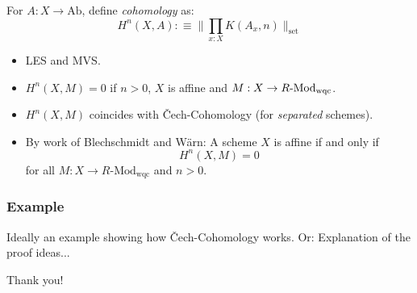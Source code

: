 \documentclass{beamer}
\begin{document}
\begin{frame}
  \vspace{0.25cm}
  For $A : X \to \mathrm{Ab}$, define \emph{cohomology} as:
  \[ H^n(X, A) :\equiv \Big\| \prod_{x:X}K(A_x,n) \Big\|_{\mathrm{set}} \]
  \begin{itemize}
  \item LES and MVS.
  \item $H^n(X,M)=0$ if $n>0$, $X$ is affine and $M:X\to R\text{-}\mathrm{Mod}_{\mathrm{wqc}}$.
  \item $H^n(X,M)$ coincides with \v{C}ech-Cohomology (for \emph{separated} schemes).
  \item By work of Blechschmidt and Wärn: A scheme $X$ is affine if and only if
      \[ H^n(X, M) = 0 \]
      for all $M : X \to R\text{-}\mathrm{Mod}_{\mathrm{wqc}}$ and $n > 0$.
  \end{itemize}
\end{frame}

\begin{frame}
  \frametitle{Example}
  Ideally an example showing how \v{C}ech-Cohomology works.
  Or: Explanation of the proof ideas...
\end{frame}

\begin{frame}
  \centering
  Thank you!
\end{frame}
\end{document}
